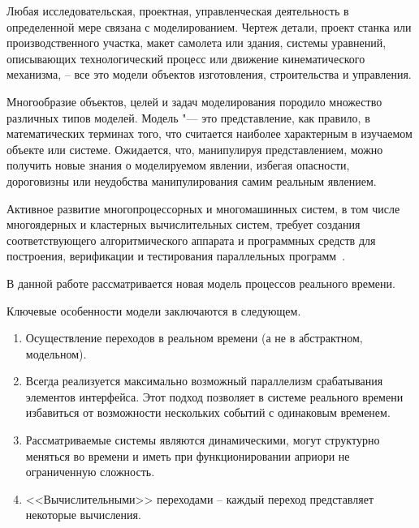 
{\actuality}
Любая исследовательская, проектная, управленческая деятельность в определенной мере связана с моделированием. Чертеж детали, проект станка или производственного участка, макет самолета или здания, системы уравнений, описывающих технологический процесс или движение кинематического механизма, – все это модели объектов изготовления, строительства и управления.

Многообразие объектов, целей и задач моделирования породило множество различных типов моделей. Модель "--- это представление, как правило, в математических терминах того, что считается наиболее характерным в изучаемом объекте или системе. Ожидается, что, манипулируя представлением, можно получить новые знания о моделируемом явлении, избегая опасности, дороговизны или неудобства манипулирования самим реальным явлением.

Активное развитие многопроцессорных и многомашинных систем, в том числе многоядерных и кластерных вычислительных систем, требует создания соответствующего алгоритмического аппарата и программных средств для построения, верификации и тестирования параллельных программ~\cite{kusmok2010model}.

В данной работе рассматривается новая модель процессов реального времени.  

Ключевые особенности модели заключаются в следующем. 
\begin{enumerate}
	\item Осуществление переходов в реальном времени (а не в абстрактном, модельном). 
	\item Всегда реализуется максимально возможный параллелизм срабатывания элементов интерфейса. Этот подход позволяет в системе реального времени избавиться от возможности нескольких событий с одинаковым временем.
	\item Рассматриваемые системы являются динамическими, могут структурно меняться во времени и иметь при функционировании априори не ограниченную сложность. 
	\item <<Вычислительными>> переходами – каждый переход представляет некоторые вычисления.
\end{enumerate}

